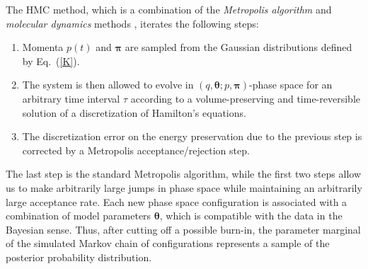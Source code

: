 \documentclass[12pt,a4paper,final]{iopart}
\newcommand{\bt}{\pmb\theta}
\begin{document}
The HMC method, which is a combination of the {\em Metropolis algorithm} \cite{metropolis_1953} and {\em molecular dynamics} methods \cite{alder_1959_MD, rahman_1964_MD}, iterates the following steps:
\begin{enumerate}
  \item
  Momenta $p(t)$ and ${\pmb\pi}$ are sampled from the Gaussian distributions defined by Eq.~(\ref{K}).
  \item
  The system is then allowed to evolve in $\left(q,\bt; p,{\pmb\pi}\right)$-phase space for an arbitrary time interval $\tau$ according to a volume-preserving and time-reversible solution of a discretization of Hamilton's equations.
  \item
  The discretization error on the energy preservation due to the previous step is corrected by a Metropolis acceptance/rejection step.
\end{enumerate}
The last step is the standard Metropolis algorithm, while the first two steps allow us to make arbitrarily large jumps in phase space while maintaining an arbitrarily large acceptance rate. Each new phase space configuration is associated with a combination of model parameters $\bt$, which is compatible with the data in the Bayesian sense. Thus, after cutting off a possible burn-in, the parameter marginal of the simulated Markov chain of configurations represents a sample of the posterior probability distribution.
\end{document}
